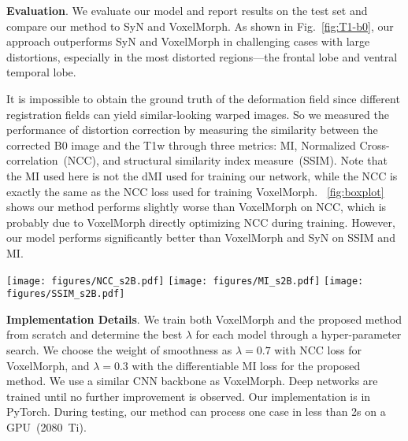 \documentclass[]{spie}  %
\begin{document}
\noindent\textbf{Evaluation}. We evaluate our model and report results on the test set and compare our method to SyN and VoxelMorph. As shown in Fig.~\ref{fig:T1-b0}, our approach outperforms SyN and VoxelMorph in challenging cases with large distortions, especially in the most distorted regions---the frontal lobe and ventral temporal lobe. 


It is impossible to obtain the ground truth of the deformation field since different registration fields can yield similar-looking warped images. So we measured the performance of distortion correction by measuring the similarity between the corrected B0 image and the T1w through three metrics: MI, Normalized Cross-correlation~(NCC), and structural similarity index measure~(SSIM). Note that the MI used here is not the dMI used for training our network, while the NCC is exactly the same as the NCC loss used for training VoxelMorph. \figurename~\ref{fig:boxplot} shows our method performs slightly worse than VoxelMorph on NCC, which is probably due to VoxelMorph directly optimizing NCC during training. However, our model performs significantly better than VoxelMorph and SyN on SSIM and MI. %


\begin{figure*}[!tb]
	\centering
	{\texttt{[image: figures/NCC\_s2B.pdf]}} 
	{\texttt{[image: figures/MI\_s2B.pdf]}} 
	{\texttt{[image: figures/SSIM\_s2B.pdf]}} 
	\caption{Quantitative comparison. We measure the similarity between distorted B0 and warped T1w through three metrics: SSIM~$\uparrow$, $\lvert \mathrm{NCC} \rvert$~$\uparrow$, and $\lvert \mathrm{MI} \rvert$~$\uparrow$. 88 different subjects from test set are evaluated. $\uparrow$ indicates the higher is better.}%
	\label{fig:boxplot}
\end{figure*}

\noindent\textbf{Implementation Details}. We train both VoxelMorph\cite{balakrishnan2019voxelmorphShort} and the proposed method from scratch and determine the best $\lambda$ for each model through a hyper-parameter search. We choose the weight of smoothness as $\lambda = 0.7$ with NCC loss for VoxelMorph, and $\lambda = 0.3$ with the differentiable MI loss for the proposed method. We use a similar CNN backbone as VoxelMorph. Deep networks are trained until no further improvement is observed. Our implementation is in PyTorch. During testing, our method can process one case in less than 2s on a GPU~(2080~Ti). 
\end{document}
